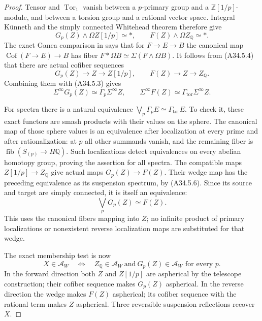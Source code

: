 \begin{proof}
Tensor and $\operatorname{Tor}_1$ vanish between a $p$-primary
group and a $\mathbb Z[1/p]$-module, and between a torsion group
and a rational vector space.  Integral K\"unneth and the simply
connected Whitehead theorem therefore give
\[
 G_p(Z)\wedge\Omega Z[1/p]\simeq *,\qquad
 F(Z)\wedge\Omega Z_{\mathbb Q}\simeq *.
 \tag{A34.5.4}
\]
The exact Ganea comparison in
\citet[Proposition 3.4, with Proposition 2.3 and Corollary 3.3]{A3ChataurScherer2006}
says that for $F\to E\to B$ the canonical map
$\operatorname{Cof}(F\to E)\to B$ has fiber
$F*\Omega B\simeq\Sigma(F\wedge\Omega B)$.
It follows from \textup{(A34.5.4)} that there are actual
cofiber sequences
\[
 G_p(Z)\longrightarrow Z\longrightarrow Z[1/p],\qquad
 F(Z)\longrightarrow Z\longrightarrow Z_{\mathbb Q}.
 \tag{A34.5.5}
\]
Combining them with \textup{(A34.5.3)} gives
\[
 \Sigma^\infty G_p(Z)\simeq\Gamma_p\Sigma^\infty Z,\qquad
 \Sigma^\infty F(Z)\simeq
       \Gamma_{\mathrm{tor}}\Sigma^\infty Z.
 \tag{A34.5.6}
\]

For spectra there is a natural equivalence
$\bigvee_p\Gamma_pE\simeq\Gamma_{\mathrm{tor}}E$.
To check it, these exact functors are smash products with their
values on the sphere.  The canonical map of those sphere values
is an equivalence after localization at every prime and after
rationalization: at $p$ all other summands vanish, and the
remaining fiber is $\operatorname{fib}(S_{(p)}\to H\mathbb Q)$.
Such localizations detect equivalences on every abelian homotopy
group, proving the assertion for all spectra.
The compatible maps $Z[1/p]\to Z_{\mathbb Q}$ give actual maps
$G_p(Z)\to F(Z)$.  Their wedge map has the preceding equivalence
as its suspension spectrum, by \textup{(A34.5.6)}.  Since its
source and target are simply connected, it is itself an equivalence:
\[
                       \bigvee_pG_p(Z)\simeq F(Z).
 \tag{A34.5.7}
\]
This uses the canonical fibers mapping into $Z$; no infinite product
of primary localizations or nonexistent reverse localization maps
are substituted for that wedge.

The exact membership test is now
\[
 X\in\mathcal A_W
 \quad\Longleftrightarrow\quad
 Z_{\mathbb Q}\in\mathcal A_W
 \ \text{and}\ G_p(Z)\in\mathcal A_W\text{ for every }p.
 \tag{A34.5.8}
\]
In the forward direction both $Z$ and $Z[1/p]$ are aspherical by
the telescope construction; their cofiber sequence makes $G_p(Z)$
aspherical.  In the reverse direction the wedge makes $F(Z)$
aspherical; its cofiber sequence with the rational term makes $Z$
aspherical.  Three reversible suspension reflections recover $X$.


\end{proof}
